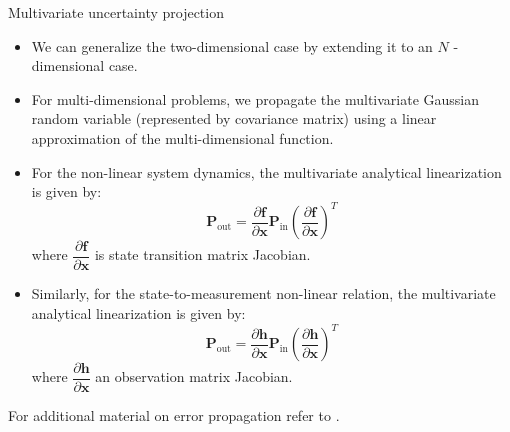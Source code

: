 \begin{frame}{Multivariate uncertainty projection}

\begin{itemize}
    \item We can generalize the two-dimensional case by extending it to an $N$ - dimensional
case.
\item For multi-dimensional problems, we propagate the multivariate Gaussian random
variable (represented by covariance matrix) using a linear approximation of the
multi-dimensional function.
\item For the non-linear system dynamics, the multivariate analytical linearization is given
by:
\[
\mathbf{P}_{\text{out}} = \dfrac{\partial \mathbf{f}}{\partial \mathbf{x}} \mathbf{P}_{\text{in}} \left( \dfrac{\partial \mathbf{f}}{\partial \mathbf{x}} \right)^T
\]
where $\dfrac{\partial \mathbf{f}}{\partial \mathbf{x}}$ is state transition matrix Jacobian.

\item Similarly, for the state-to-measurement non-linear relation, the multivariate analytical
linearization is given by:
\[
\mathbf{P}_{\text{out}} = \dfrac{\partial \mathbf{h}}{\partial \mathbf{x}} \mathbf{P}_{\text{in}} \left( \dfrac{\partial \mathbf{h}}{\partial \mathbf{x}} \right)^T
\]
where $\dfrac{\partial \mathbf{h}}{\partial \mathbf{x}}$ an observation matrix Jacobian.
 \end{itemize}

For additional material on error propagation refer to \cite{fx1998introduction}.
\end{frame}


